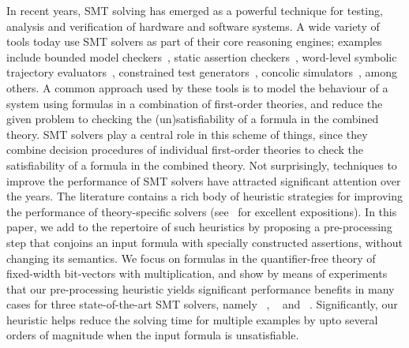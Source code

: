 %
In recent years, SMT solving has emerged as a powerful technique for
testing, analysis and verification of hardware and software systems.
A wide variety of tools today use SMT solvers as part of their core
reasoning engines; examples include bounded model
checkers~\cite{hwcbmc,boolector,ebmc,cbmc}, static assertion
checkers~\cite{corral,boogie}, word-level symbolic trajectory
evaluators~\cite{wste}, constrained test
generators~\cite{crv1,crv2,dart}, concolic simulators~\cite{concolic},
among others.  A common approach used by these tools is to model the
behaviour of a system using formulas in a combination of first-order
theories, and reduce the given problem to checking the
(un)satisfiability of a formula in the combined theory.  SMT solvers
play a central role in this scheme of things, since they combine
decision procedures of individual first-order theories to check the
satisfiability of a formula in the combined theory.  Not surprisingly,
techniques to improve the performance of SMT solvers have attracted
significant attention over the years.  The literature contains a rich
body of heuristic strategies for improving the performance of
theory-specific solvers (see~\cite{barrett,deMoura2013} for excellent
expositions). In this paper, we add to the repertoire of such
heuristics by proposing a pre-processing step that conjoins an input
formula with specially constructed assertions, without changing its
semantics. We focus on formulas in the quantifier-free theory of
fixed-width bit-vectors with multiplication, and show by means of
experiments that our pre-processing heuristic yields significant
performance benefits in many cases for three state-of-the-art SMT
solvers, namely {\zthree}~\cite{zthree}, {\cvcfour}~\cite{cvcfour} and
{\boolector}~\cite{boolector}. Significantly, our heuristic helps
reduce the solving time for multiple examples by upto several orders
of magnitude when the input formula is unsatisfiable.


